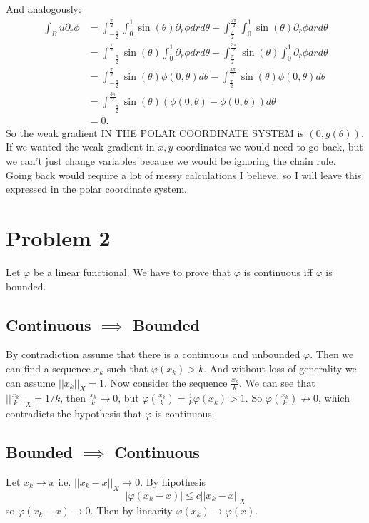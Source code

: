 \documentclass{article}
\begin{document}
And analogously:
\begin{align*}
	\int_{B}u\partial_r\phi &=\int_{-\frac{\pi}{2}}^{\frac{\pi}{2}} \int_0^1 \sin(\theta)\partial_r\phi drd\theta
		      -\int_{\frac{\pi}{2}}^{\frac{3\pi}{2}} \int_0^1 \sin(\theta)\partial_r\phi drd\theta\\
		  &=\int_{-\frac{\pi}{2}}^{\frac{\pi}{2}} \sin(\theta)\int_0^1 \partial_r\phi drd\theta
		      -\int_{\frac{\pi}{2}}^{\frac{3\pi}{2}} \sin(\theta)\int_0^1 \partial_r\phi drd\theta\\
		  &=\int_{-\frac{\pi}{2}}^{\frac{\pi}{2}} \sin(\theta) \phi(0,\theta)d\theta
		      -\int_{\frac{\pi}{2}}^{\frac{3\pi}{2}} \sin(\theta)\phi(0,\theta) d\theta\\
		  &=\int_{-\frac{\pi}{2}}^{\frac{3\pi}{2}} \sin(\theta) (\phi(0,\theta)-\phi(0,\theta))d\theta\\
		  &=0.
\end{align*}
So the weak gradient IN THE POLAR COORDINATE SYSTEM is $(0,g(\theta))$. If we
wanted the weak gradient in $x,y$ coordinates we would need to go back, but we
can't just change variables because we would be ignoring the chain rule. Going
back would require a lot of messy calculations I believe, so I will leave this
expressed in the polar coordinate system.
\section*{Problem 2}
Let $\varphi$ be a linear functional. We have to prove that $\varphi$ is continuous
iff $\varphi$ is bounded.
\subsection*{Continuous $\implies$ Bounded}
By contradiction assume that there is a continuous and unbounded $\varphi$.
Then we can find a sequence $x_k$ such that $\varphi(x_k)>k$. And without loss
of generality we can assume $||x_k||_X=1$. Now consider the sequence
$\frac{x_k}{k}$. We can see that $||\frac{x_k}{k}||_X=1/k$, then $\frac{x_k}{k}
\to 0$, but $\varphi(\frac{x_k}{k})=\frac{1}{k}\varphi(x_k)>1$. So
$\varphi(\frac{x_k}{k}) \not \to 0$, which contradicts the hypothesis that
$\varphi$ is continuous.
\subsection*{Bounded $\implies$ Continuous}
Let $x_k \to x$ i.e. $||x_k-x||_X \to 0$. By hipothesis
\[
	|\varphi(x_k-x)|\leq c ||x_k-x||_X
\]
so $\varphi(x_k-x) \to 0$. Then by linearity $\varphi(x_k)\to \varphi(x)$.
\end{document}
